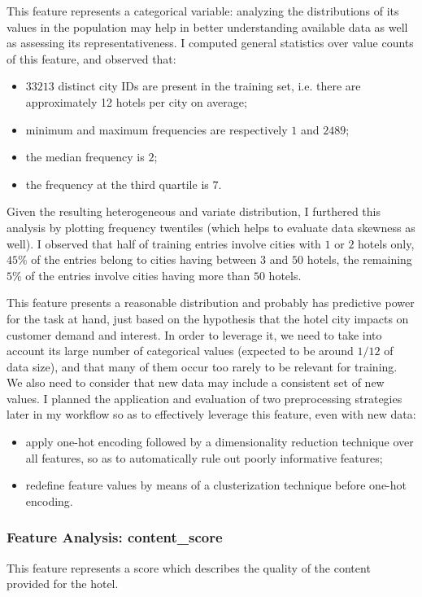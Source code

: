 \documentclass[preprint,12pt,3p]{elsarticle}
\begin{document}
This feature represents a categorical variable: analyzing the distributions of its values in the population may help in better understanding available data as well as assessing its representativeness. I computed general statistics over value counts of this feature, and observed that:
\begin{itemize}
	\item $33213$ distinct city IDs are present in the training set, i.e. there are approximately 12 hotels per city on average;
	\item minimum and maximum frequencies are respectively $1$ and $2489$;
	\item the median frequency is $2$;
	\item the frequency at the third quartile is $7$.
\end{itemize}
Given the resulting heterogeneous and variate distribution, I furthered this analysis by plotting frequency twentiles (which helps to evaluate data skewness as well). I observed that half of training entries involve cities with $1$ or $2$ hotels only, $45\%$ of the entries belong to cities having between $3$ and $50$ hotels, the remaining $5\%$ of the entries involve cities having more than $50$ hotels.

This feature presents a reasonable distribution and probably has predictive power for the task at hand, just based on the hypothesis that the hotel city impacts on customer demand and interest. In order to leverage it, we need to take into account its large number of categorical values (expected to be around $1/12$ of data size), and that many of them occur too rarely to be relevant for training. We also need to consider that new data may include a consistent set of new values.
I planned the application and evaluation of two preprocessing strategies later in my workflow so as to effectively leverage this feature, even with new data:
\begin{itemize}
	\item apply one-hot encoding followed by a dimensionality reduction technique over all features, so as to automatically rule out poorly informative features;
	\item redefine feature values by means of a clusterization technique before one-hot encoding.
\end{itemize}

\subsubsection{Feature Analysis: content\_score}
This feature represents a score which describes the quality of the content provided for the hotel.
\end{document}
